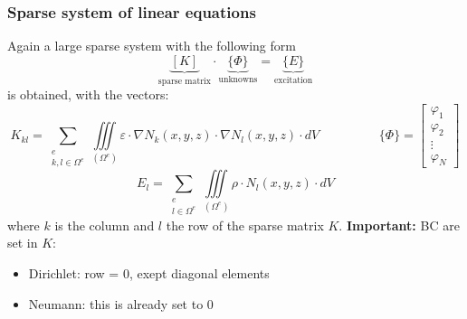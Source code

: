 \subsubsection{Sparse system of linear equations}
Again a large sparse system with the following form
\begin{equation*}	
	\underbrace{\left[K\right]}_{\textrm{sparse matrix}} \cdot \underbrace{\{\Phi\}}_{\textrm{unknowns}} = \underbrace{\{E\}}_{\textrm{excitation}}
\end{equation*}
is obtained, with the vectors:
\begin{equation*}
	K_{kl} = \sum_{\substack{e\\k,l\in\Omega^e}} \iiint\limits_{\left(\Omega ^e\right)} \varepsilon \cdot \nabla N_k(x,y,z) \cdot \nabla N_l(x,y,z) \cdot dV
	\hspace{2cm}
	\{\Phi\} =
	\begin{bmatrix}
		\varphi_1 \\
		\varphi_2 \\ 
		\vdots \\
		\varphi_N
	\end{bmatrix}
\end{equation*}
\begin{equation*}
	E_l = \sum_{\substack{e\\l\in\Omega^e}} \iiint\limits_{\left(\Omega ^e\right)} \rho \cdot N_l(x,y,z) \cdot dV
\end{equation*}
where $k$ is the column and $l$ the row of the sparse matrix $K$. \newline \newline
\textbf{Important:} BC are set in $K$:
\begin{itemize}
	\item Dirichlet: row = 0, exept diagonal elements
	\item Neumann: this is already set to 0
\end{itemize}